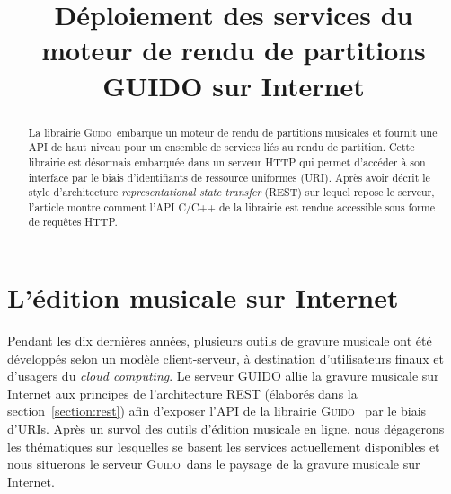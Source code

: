 \documentclass{article}
\title{Déploiement des services du moteur de rendu de partitions GUIDO sur Internet}
\date{}
\newcommand{\guido}		{\textsc{Guido}}
\begin{document}
\maketitle

\begin{abstract}

La librairie \guido\ embarque un moteur de rendu de partitions musicales et fournit une API de haut niveau pour un ensemble de services liés au rendu de partition. Cette librairie est désormais embarquée dans un serveur HTTP qui permet d'accéder à son interface par le biais d'identifiants de ressource uniformes (URI). Après avoir décrit le style d'architecture \emph{representational state transfer} (REST) sur lequel repose le serveur, l'article montre comment l'API C/C++ de la librairie est rendue accessible sous forme de requêtes HTTP.

\end{abstract}


\section{L'édition musicale sur Internet}\label{section:online-musical-editing}
Pendant les dix dernières années, plusieurs outils de gravure musicale ont été développés selon un modèle client-serveur, à destination d'utilisateurs finaux et d'usagers du \emph{cloud computing}. Le serveur GUIDO allie la gravure musicale sur Internet aux principes de l'architecture REST (élaborés dans la section~\ref{section:rest}) afin d'exposer l'API de la librairie \guido\ \cite{guidolib1.52} \cite{guido} \cite{daudin09a} par le biais d'URIs. Après un survol des outils d'édition musicale en ligne, nous dégagerons les thématiques sur lesquelles se basent les services actuellement disponibles et nous situerons le serveur \guido\ dans le paysage de la gravure musicale sur Internet.
\end{document}
